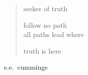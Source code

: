 \documentclass[letterpaper]{exam}
\begin{document}
  \ifprintanswers{}
  \else
    \vspace{7 cm}

    \begin{verse}
      seeker of truth

      follow no path \\
      all paths lead where

      truth is here 
    \end{verse}
    \hspace{1 in} e.e.\ cummings

  \fi
\end{document}
